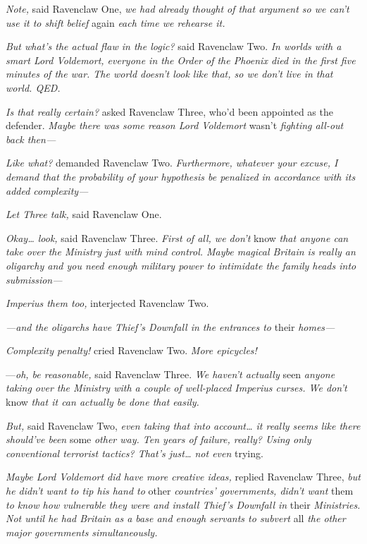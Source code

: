 \emph{Note,} said Ravenclaw One, \emph{we had already thought of that argument 
so we can't use it to shift belief} again\emph{ each time we rehearse it.}

\emph{But what's the actual flaw in the logic?} said Ravenclaw Two. \emph{In 
worlds with a smart Lord Voldemort, everyone in the Order of the Phoenix died 
in the first five minutes of the war. The world doesn't look like that, so we 
don't live in that world. QED.}

\emph{Is that really certain?} asked Ravenclaw Three, who'd been appointed as 
the defender. \emph{Maybe there was some reason Lord Voldemort} wasn't 
\emph{fighting all-out back then---}

\emph{Like what?} demanded Ravenclaw Two. \emph{Furthermore, whatever your 
excuse, I demand that the probability of your hypothesis be penalized in 
accordance with its added complexity---}

\emph{Let Three talk,} said Ravenclaw One.

\emph{Okay{\ldots} look,} said Ravenclaw Three. \emph{First of all, we don't} 
know\emph{ that anyone can take over the Ministry just with mind control. Maybe 
magical Britain is really an oligarchy and you need enough military power to 
intimidate the family heads into submission---}

\emph{Imperius them too,} interjected Ravenclaw Two.

\emph{---and the oligarchs have Thief's Downfall in the entrances to} 
their\emph{ homes---}

\emph{Complexity penalty!} cried Ravenclaw Two. \emph{More epicycles!}

---\emph{oh, be reasonable,} said Ravenclaw Three. \emph{We haven't actually} 
seen\emph{ anyone taking over the Ministry with a couple of well-placed 
Imperius curses. We don't} know\emph{ that it can actually be done that easily.}

\emph{But,} said Ravenclaw Two, \emph{even taking that into account{\ldots} it 
really seems like there should've been} some\emph{ other way. Ten years of 
failure, really? Using only conventional terrorist tactics? That's just{\ldots} 
not even} trying.

\emph{Maybe Lord Voldemort did have more creative ideas,} replied Ravenclaw 
Three, \emph{but he didn't want to tip his hand to} other\emph{ countries' 
governments, didn't want} them\emph{ to know how vulnerable they were and 
install Thief's Downfall in} their\emph{ Ministries. Not until he had Britain 
as a base and enough servants to subvert} all\emph{ the other major governments 
simultaneously.}

